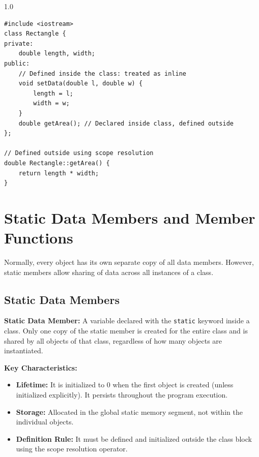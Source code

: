 \documentclass[12pt,a4paper]{article}
\begin{document}
\begin{tcolorbox}[examplebox, title={Code Example: Inside vs. Outside class definitions}]
\begin{spacing}{1.0}
\begin{verbatim}
#include <iostream>
class Rectangle {
private:
    double length, width;
public:
    // Defined inside the class: treated as inline
    void setData(double l, double w) {
        length = l;
        width = w;
    }
    double getArea(); // Declared inside class, defined outside
};

// Defined outside using scope resolution
double Rectangle::getArea() {
    return length * width;
}
\end{verbatim}
\end{spacing}
\end{tcolorbox}

\section{Static Data Members and Member Functions}

Normally, every object has its own separate copy of all data members. However, static members allow sharing of data across all instances of a class.

\subsection{Static Data Members}
\begin{tcolorbox}[defbox]
\textbf{Static Data Member:} A variable declared with the \texttt{static} keyword inside a class. Only one copy of the static member is created for the entire class and is shared by all objects of that class, regardless of how many objects are instantiated.
\end{tcolorbox}
\textbf{Key Characteristics:}
\begin{itemize}[leftmargin=*, itemsep=2pt]
  \item \textbf{Lifetime:} It is initialized to 0 when the first object is created (unless initialized explicitly). It persists throughout the program execution.
  \item \textbf{Storage:} Allocated in the global static memory segment, not within the individual objects.
  \item \textbf{Definition Rule:} It must be defined and initialized outside the class block using the scope resolution operator.
\end{itemize}
\end{document}

